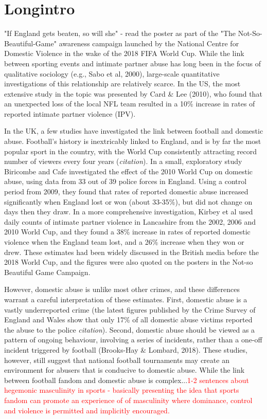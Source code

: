 \documentclass[12pt, letterpaper]{article}
\begin{document}
\section{Longintro}

"If England gets beaten, so will she" - read the poster as part of the "The Not-So-Beautiful-Game" awareness campaign launched by the National Centre for Domestic Violence in the wake of the 2018 FIFA World Cup. While the link between sporting events and intimate partner abuse has long been in the focus of qualitative sociology (e.g., Sabo et al, 2000), large-scale quantitative investigations of this relationship are relatively scarce. In the US, the most extensive study in the topic was presented by Card \& Lee (2010), who found that an unexpected loss of the local NFL team resulted in a 10\% increase in rates of reported intimate partner violence (IPV).

In the UK, a few studies have investigated the link between football and domestic abuse. Football's history is inextricably linked to England, and is by far the most popular sport in the country, with the World Cup consistently attracting record number of viewers every four years (\textit{citation}). In a small, exploratory study Biricombe and Cafe investigated the effect of the 2010 World Cup on domestic abuse, using data from 33 out of 39 police forces in England. Using a control period from 2009, they found that rates of reported domestic abuse increased significantly when England lost or won (about 33-35\%), but did not change on days then they draw. In a more comprehensive investigation, Kirbey et al used daily counts of intimate partner violence in Lancashire from the 2002, 2006 and 2010 World Cup, and they found a 38\% increase in rates of reported domestic violence when the England team lost, and a 26\% increase when they won or drew. These estimates had been widely discussed in the British media before the 2018 World Cup, and the figures were also quoted on the posters in the Not-so Beautiful Game Campaign.  

However, domestic abuse is unlike most other crimes, and these differences warrant a careful interpretation of these estimates. First, domestic abuse is a vastly underreported crime (the latest figures published by the Crime Survey of England and Wales show that only 17\% of all domestic abuse victims reported the abuse to the police \textit{citation}). Second, domestic abuse should be viewed as a pattern of ongoing behaviour, involving a series of incidents, rather than a one-off incident triggered by football (Brooks-Hay \& Lombard, 2018). These studies, however, still suggest that national football tournaments may create an environment for abusers that is conducive to domestic abuse. While the link between football fandom and domestic abuse is complex...\textcolor{red}{1-2 sentences about hegemonic masculinity in sports - basically presenting the idea that sports fandom can promote an experience of of masculinity where dominance, control and violence is permitted and implicitly encouraged.}
\end{document}
